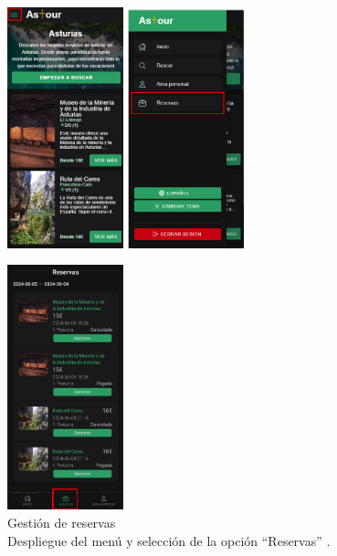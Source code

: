 \begin{figure}[H]
	\centering
	\begin{minipage}{0.45\textwidth}
		\centering
		\includegraphics[width=0.3\textwidth]{7-Construccion/Manuales/mobile/menu marcado.png}
		\includegraphics[width=0.3\textwidth]{7-Construccion/Manuales/mobile/reservas marcado.png}
		\caption{Gestión de reservas \\ Despliegue del menú y selección de la opción “Reservas” .}
		\label{fig:opcion-mobile-reservas}
	\end{minipage}
	\hfill
	\begin{minipage}{0.45\textwidth}
		\centering
		\includegraphics[width=0.3\textwidth]{7-Construccion/Manuales/app/P1-GestionReserva.png}

\end{minipage}
\end{figure}
